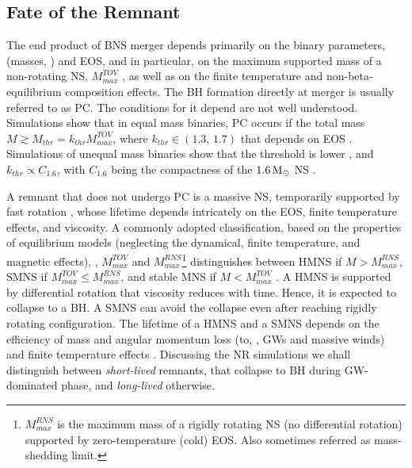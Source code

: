 \subsection{Fate of the Remnant}

The end product of \ac{BNS} merger depends primarily on the binary parameters, (masses, 
\mr{}) and \ac{EOS}, and in particular, on the maximum supported mass of a non-rotating 
\ac{NS}, $M_{max}^{TOV}$ \citep{Shibata:2016}, as well as on the finite temperature and 
non-beta-equilibrium composition effects. 
%
The \ac{BH} formation directly at merger is usually referred to as \ac{PC}. 
The conditions for it depend  are not well understood. 
Simulations show that in equal mass binaries, \ac{PC} occurs if the total mass 
$M\gtrsim M_{thr} = k_{thr}M_{max}^{TOV}$, where $k_{thr}\in(1.3,\,1.7)$ that depends on 
\ac{EOS} \citep{Shibata:2005ss,Shibata:2006nm,Hotokezaka:2011dh,Bauswein:2013jpa}.
Simulations of unequal mass binaries show that the threshold is lower \citep{Bauswein:2017vtn}, 
and $k_{thr}\propto C_{1.6}$, with $C_{1.6}$ being the compactness of the $1.6\,{\text{M}_{\odot}}$ 
\ac{NS} \citep{Hotokezaka:2011dh,Bauswein:2013jpa,Bauswein:2017vtn}. 

A remnant that does not undergo \ac{PC} is a massive \ac{NS}, temporarily supported 
by fast rotation \citep{Baumgarte:1999cq,Rosswog:2001fh,Shibata:2005ss,Shibata:2006nm,
    Sekiguchi:2011zd,Hotokezaka:2013iia,Bernuzzi:2015opx}, whose lifetime depends 
intricately on the \ac{EOS}, finite temperature effects, and viscosity. A commonly 
adopted classification, based on the properties of equilibrium models (neglecting the 
dynamical, finite temperature, and magnetic effects), \ie, $M_{max}^{TOV}$ and
$M_{max}^{RNS}$\footnote{
    $M_{max}^{RNS}$ is the maximum mass of a rigidly rotating \ac{NS} (no differential 
    rotation) supported by zero-temperature (cold) \ac{EOS}. Also sometimes referred as 
    mass-shedding limit.
}
distinguishes between 
\ac{HMNS} if $M{>}M_{max}^{RNS}$, 
\ac{SMNS} if $M_{max}^{TOV} {\leq} M_{max}^{RNS}$,
and stable \ac{MNS} if $M {<} M_{max}^{TOV}$ \citep[\eg][]{Baumgarte:1999cq}.
A \ac{HMNS} is supported by differential rotation that viscosity reduces with time. 
Hence, it is expected to collapse to a \ac{BH}. A \ac{SMNS} can avoid the collapse 
even after reaching rigidly rotating configuration. The lifetime of a \ac{HMNS} and 
a \ac{SMNS} depends on the efficiency of mass and angular momentum loss 
(to, \eg, \acp{GW} and massive winds) and finite temperature effects \citep{Radice:2018xqa}. 
%
Discussing the \ac{NR} simulations we shall distinguish between \textit{short-lived} remnants, 
that collapse to \ac{BH} during \ac{GW}-dominated phase, 
and \textit{long-lived} otherwise.

